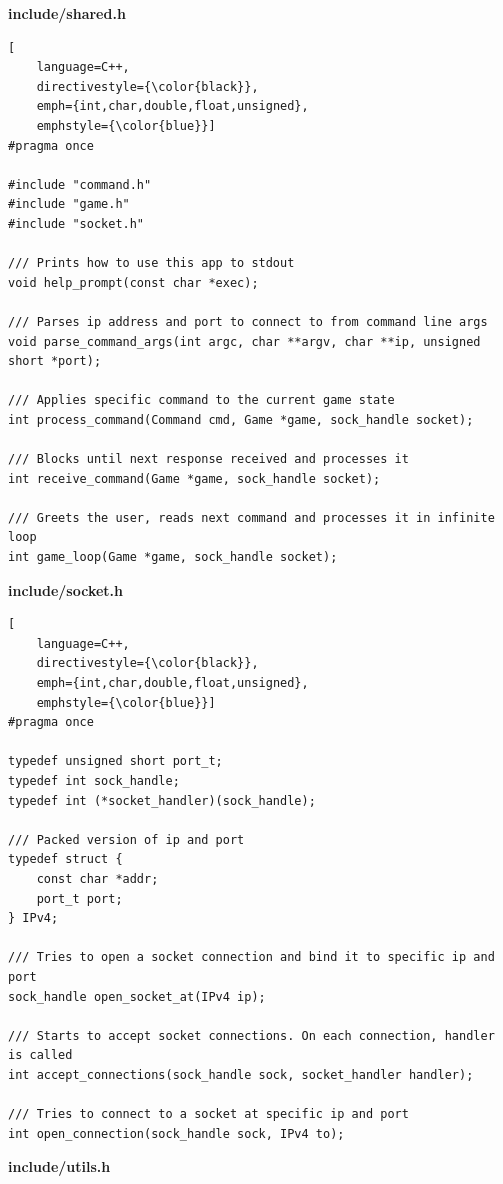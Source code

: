 \textbf{include/shared.h}

\begin{lstlisting}[
    language=C++,
    directivestyle={\color{black}}, 
    emph={int,char,double,float,unsigned}, 
    emphstyle={\color{blue}}]
#pragma once

#include "command.h"
#include "game.h"
#include "socket.h"

/// Prints how to use this app to stdout
void help_prompt(const char *exec);

/// Parses ip address and port to connect to from command line args
void parse_command_args(int argc, char **argv, char **ip, unsigned short *port);

/// Applies specific command to the current game state
int process_command(Command cmd, Game *game, sock_handle socket);

/// Blocks until next response received and processes it
int receive_command(Game *game, sock_handle socket);

/// Greets the user, reads next command and processes it in infinite loop
int game_loop(Game *game, sock_handle socket);
\end{lstlisting}

\textbf{include/socket.h}

\begin{lstlisting}[
    language=C++,
    directivestyle={\color{black}}, 
    emph={int,char,double,float,unsigned}, 
    emphstyle={\color{blue}}]
#pragma once

typedef unsigned short port_t;
typedef int sock_handle;
typedef int (*socket_handler)(sock_handle);

/// Packed version of ip and port
typedef struct {
    const char *addr;
    port_t port;
} IPv4;

/// Tries to open a socket connection and bind it to specific ip and port
sock_handle open_socket_at(IPv4 ip);

/// Starts to accept socket connections. On each connection, handler is called
int accept_connections(sock_handle sock, socket_handler handler);

/// Tries to connect to a socket at specific ip and port
int open_connection(sock_handle sock, IPv4 to);
\end{lstlisting}

\textbf{include/utils.h}

